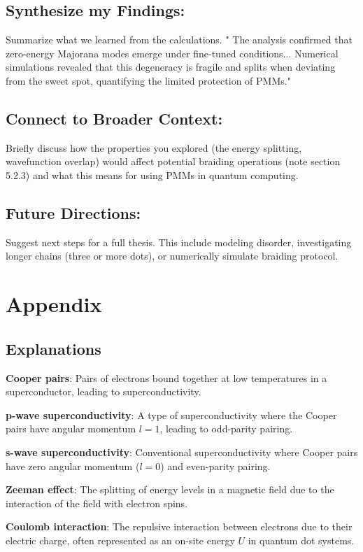 \documentclass[11pt, letterpaper, titlepage]{article}
\begin{document}
\subsection{Synthesize my Findings:} Summarize what we learned from the calculations. " The analysis confirmed that zero-energy Majorana modes emerge under fine-tuned conditions... Numerical simulations revealed that this degeneracy is fragile and splits when deviating from the sweet spot, quantifying the limited protection of PMMs."\par
\subsection{Connect to Broader Context:} Briefly discuss how the properties you explored (the energy splitting, wavefunction overlap) would affect potential braiding operations (note section 5.2.3) and what this means for using PMMs in quantum computing.\par
\subsection{Future Directions:} Suggest next steps for a full thesis. This include modeling disorder, investigating longer chains (three or more dots), or numerically simulate braiding protocol.

\newpage
\section{Appendix}
\subsection{Explanations}

\textbf{Cooper pairs}: Pairs of electrons bound together at low temperatures in a superconductor, leading to superconductivity.

\textbf{p-wave superconductivity}: A type of superconductivity where the Cooper pairs have angular momentum \(l=1\), leading to odd-parity pairing.  

\textbf{s-wave superconductivity}: Conventional superconductivity where Cooper pairs have zero angular momentum (\(l=0\)) and even-parity pairing.  

\textbf{Zeeman effect}: The splitting of energy levels in a magnetic field due to the interaction of the field with electron spins.  

\textbf{Coulomb interaction}: The repulsive interaction between electrons due to their electric charge, often represented as an on-site energy \(U\) in quantum dot systems.
\end{document}
